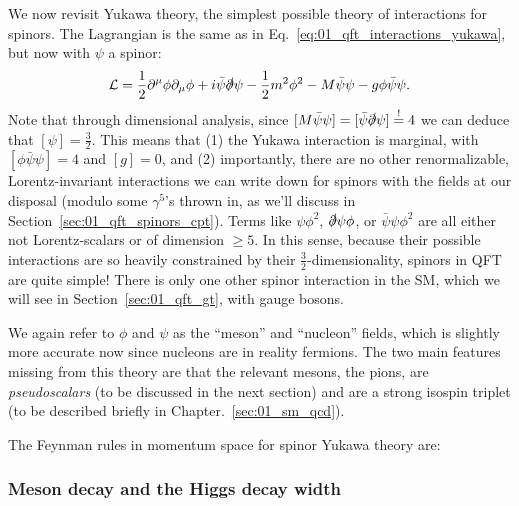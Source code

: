 We now revisit Yukawa theory, the simplest possible theory of interactions for spinors.
The Lagrangian is the same as in Eq.~\ref{eq:01_qft_interactions_yukawa}, but now with $\psi$ a spinor:
\begin{equation}
	\label{eq:01_qft_spinors_yukawa_lagrangian}
	\mathcal{L} = \frac{1}{2}\partial^\mu\phi\partial_\mu\phi + i\bar\psi\slashed{\partial}\psi - \frac{1}{2}m^2\phi^2 - M\bar\psi\psi - g\phi\bar\psi\psi.
\end{equation}
Note that through dimensional analysis, since $[M\bar\psi\psi] = [\bar\psi\slashed{\partial}\psi] \overset{!}{=} 4$ we can deduce that $[\psi] = \frac{3}{2}$.
This means that (1) the Yukawa interaction is marginal, with $[\phi\bar\psi\psi] = 4$ and $[g] = 0$, and (2) importantly, there are no other renormalizable, Lorentz-invariant interactions we can write down for spinors with the fields at our disposal (modulo some $\gamma^5$'s thrown in, as we'll discuss in Section~\ref{sec:01_qft_spinors_cpt}).
Terms like $\psi\phi^2$, $\slashed{\partial}\psi\phi$, or $\bar\psi\psi\phi^2$ are all either not Lorentz-scalars or of dimension $\geq 5$.
In this sense, because their possible interactions are so heavily constrained by their $\frac{3}{2}$-dimensionality, spinors in QFT are quite simple!
There is only one other spinor interaction in the SM, which we will see in Section~\ref{sec:01_qft_gt}, with gauge bosons.

We again refer to $\phi$ and $\psi$ as the ``meson'' and ``nucleon'' fields, which is slightly more accurate now since nucleons are in reality fermions.
The two main features missing from this theory are that the relevant mesons, the pions, are \textit{pseudoscalars} (to be discussed in the next section) and are a strong isospin triplet (to be described briefly in Chapter.~\ref{sec:01_sm_qcd}).

\begin{definition}
	\label{def:01_qft_spinors_yukawa_feynman}
	The Feynman rules in momentum space for spinor Yukawa theory are:
	
\end{definition}

\subsubsection{Meson decay and the Higgs decay width}



